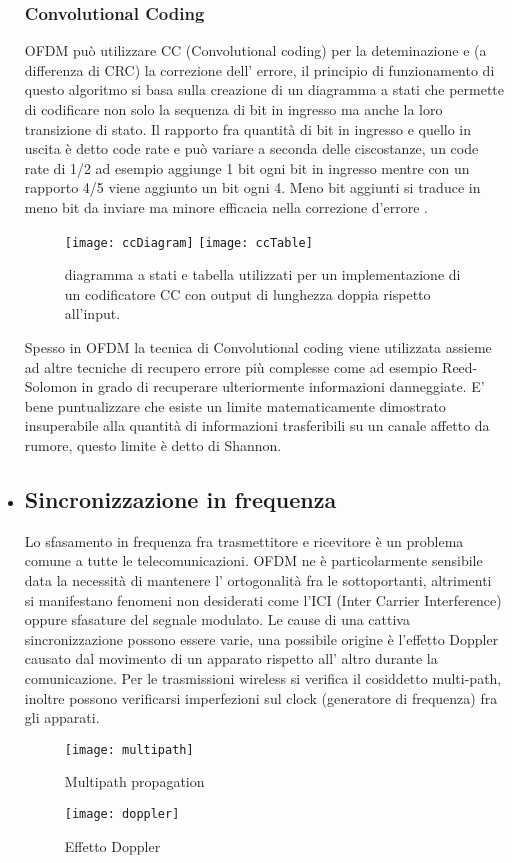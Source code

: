 \begin{itemize}
 \subsubsection{Convolutional Coding}OFDM può utilizzare CC (Convolutional coding) per la deteminazione e (a differenza di CRC) la correzione dell' errore, il principio di funzionamento di questo algoritmo si basa sulla creazione di un diagramma a stati che permette di codificare non solo la sequenza di bit in ingresso ma anche la loro transizione di stato. Il rapporto fra quantità di bit in ingresso e quello in uscita è detto code rate e può variare a seconda delle ciscostanze, un code rate di 1/2 ad esempio aggiunge 1 bit ogni bit in ingresso mentre con un rapporto 4/5 viene aggiunto un bit ogni 4. Meno bit aggiunti si traduce in meno bit da inviare ma minore efficacia nella correzione d'errore \cite{cc}.
	 \begin{figure}[h]
	 	\centering
	 	\texttt{[image: ccDiagram]}
	 	\texttt{[image: ccTable]}
	 	\caption{diagramma a stati e tabella utilizzati per un implementazione di un codificatore CC con output di lunghezza doppia rispetto all'input.}\label{fig:1}
	 \end{figure}
 Spesso in OFDM la tecnica di Convolutional coding viene utilizzata assieme ad altre tecniche di recupero errore più complesse come ad esempio Reed-Solomon in grado di recuperare ulteriormente informazioni danneggiate.
 E' bene puntualizzare che esiste un limite matematicamente dimostrato insuperabile alla quantità di informazioni trasferibili su un canale affetto da rumore, questo limite è detto di Shannon.
 \cite{ofdmWiki}
 \item \subsection{Sincronizzazione in frequenza}
 Lo sfasamento in frequenza fra trasmettitore e ricevitore è un problema comune a tutte le telecomunicazioni. OFDM ne è particolarmente sensibile data la necessità di mantenere l' ortogonalità fra le sottoportanti, altrimenti si manifestano fenomeni non desiderati come l'ICI (Inter Carrier Interference) oppure sfasature del segnale modulato.
 Le cause di una cattiva sincronizzazione possono essere varie, una possibile origine è l'effetto Doppler causato dal movimento di un apparato rispetto all' altro durante la comunicazione. Per le trasmissioni wireless si verifica il cosiddetto multi-path, inoltre possono verificarsi imperfezioni sul clock (generatore di frequenza) fra gli apparati.
 \begin{figure}[h]
 	\centering
 	\begin{minipage}[b]{.55\columnwidth}
 		\texttt{[image: multipath]}
 		\caption{Multipath propagation \cite{ofdm-simboli}}\label{fig:1}
 	\end{minipage}\hfill
 	\begin{minipage}[b]{.35\columnwidth}
 		\texttt{[image: doppler]}
 		\caption{Effetto Doppler \cite{doppler}}\label{fig:1}
 	\end{minipage}\hfill
 \end{figure}
 

\end{itemize}
